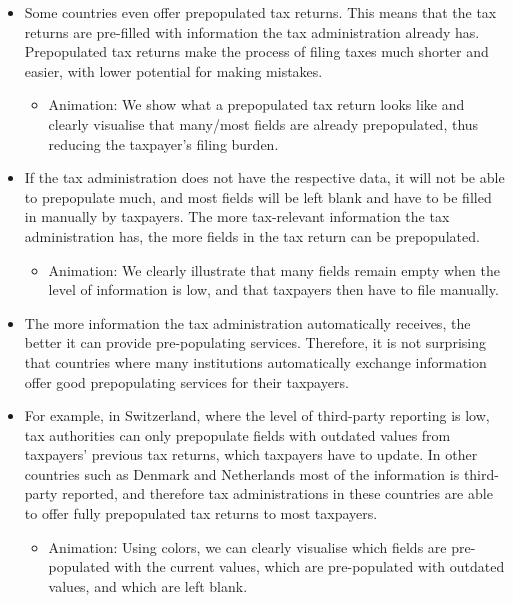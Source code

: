 \documentclass[11pt]{article}
\begin{document}
\begin{itemize}
\begin{itemize}
    \end{itemize}
    \item Some countries even offer prepopulated tax returns. This means that the tax returns are pre-filled with information the tax administration already has. Prepopulated tax returns make the process of filing taxes much shorter and easier, with lower potential for making mistakes.
    \begin{itemize}
        \item Animation: We show what a prepopulated tax return looks like and clearly visualise that many/most fields are already prepopulated, thus reducing the taxpayer's filing burden. 
    \end{itemize}
    \item If the tax administration does not have the respective data, it will not be able to prepopulate much, and most fields will be left blank and have to be filled in manually by taxpayers. The more tax-relevant information the tax administration has, the more fields in the tax return can be prepopulated.
    \begin{itemize}
        \item Animation: We clearly illustrate that many fields remain empty when the level of information is low, and that taxpayers then have to file manually.
    \end{itemize}
    \item The more information the tax administration automatically receives, the better it can provide pre-populating services. Therefore, it is not surprising that countries where many institutions automatically exchange information offer good prepopulating services for their taxpayers.
    \item For example, in Switzerland, where the level of third-party reporting is low, tax authorities can only prepopulate fields with outdated values from taxpayers’ previous tax returns, which taxpayers have to update. In other countries such as  Denmark and Netherlands most of the information is third-party reported, and therefore tax administrations in these countries are able to offer fully prepopulated tax returns to most taxpayers.
    \begin{itemize}
        \item Animation: Using colors, we can clearly visualise which fields are pre-populated with the current values, which are pre-populated with outdated values, and which are left blank.

\end{itemize}
\end{itemize}
\end{document}
